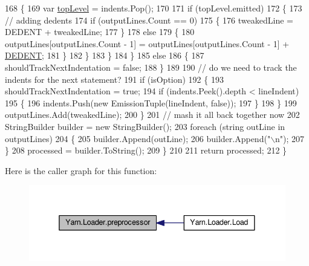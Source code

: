 \begin{DoxyCode}
168                         \{
169                             var \hyperlink{a00348_a8b7e5c0b2c6870eaa8f9454b4f33678b}{topLevel} = indents.Pop();
170 
171                             \textcolor{keywordflow}{if} (topLevel.emitted)
172                             \{
173                                 \textcolor{comment}{// adding dedents}
174                                 \textcolor{keywordflow}{if} (outputLines.Count == 0)
175                                 \{
176                                     tweakedLine = DEDENT + tweakedLine;
177                                 \}
178                                 \textcolor{keywordflow}{else}
179                                 \{
180                                     outputLines[outputLines.Count - 1] = outputLines[outputLines.Count - 1]
       + \hyperlink{a00348_a83653c3e52fa74614e655a91ad2b7181}{DEDENT};
181                                 \}
182                             \}
183                         \}
184                     \}
185                     \textcolor{keywordflow}{else}
186                     \{
187                         shouldTrackNextIndentation = \textcolor{keyword}{false};
188                     \}
189 
190                     \textcolor{comment}{// do we need to track the indents for the next statement?}
191                     \textcolor{keywordflow}{if} (isOption)
192                     \{
193                         shouldTrackNextIndentation = \textcolor{keyword}{true};
194                         \textcolor{keywordflow}{if} (indents.Peek().depth < lineIndent)
195                         \{
196                             indents.Push(\textcolor{keyword}{new} EmissionTuple(lineIndent, \textcolor{keyword}{false}));
197                         \}
198                     \}
199                     outputLines.Add(tweakedLine);
200                 \}
201                 \textcolor{comment}{// mash it all back together now}
202                 StringBuilder builder = \textcolor{keyword}{new} StringBuilder();
203                 \textcolor{keywordflow}{foreach} (\textcolor{keywordtype}{string} outLine \textcolor{keywordflow}{in} outputLines)
204                 \{
205                     builder.Append(outLine);
206                     builder.Append(\textcolor{stringliteral}{"\(\backslash\)n"});
207                 \}
208                 processed = builder.ToString();
209             \}
210 
211             \textcolor{keywordflow}{return} processed;
212         \}
\end{DoxyCode}


Here is the caller graph for this function\-:
\nopagebreak
\begin{figure}[H]
\begin{center}
\leavevmode
\includegraphics[width=338pt]{a00133_a0b09a29edd2ed13d52203f1b71a47081_icgraph}
\end{center}
\end{figure}


